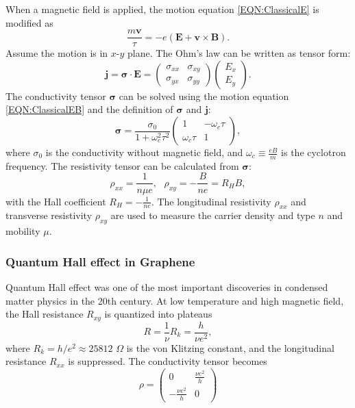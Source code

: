 \documentclass[pdflatex, sectionletters, 12pt]{pittetd}    %
\begin{document}
When a magnetic field is applied, the motion equation \ref{EQN:ClassicalE} is modified as 
\begin{equation}
\frac{m\mathbf{v}}{\tau} = -e(\mathbf{E} + \mathbf{v} \times \mathbf{B}).
\label{EQN:ClassicalEB}
\end{equation}
Assume the motion is in $x$-$y$ plane. The Ohm's law can be written as tensor form:
$$
\mathbf{j} = 
\mathbf{\sigma} \cdot \mathbf{E} =
\begin{pmatrix}
\sigma_{xx} & \sigma_{xy} \\
\sigma_{yx} & \sigma_{yy}
\end{pmatrix}
\begin{pmatrix}
E_{x} \\
E_{y}
\end{pmatrix}.
$$
The conductivity tensor $\mathbf{\sigma}$ can be solved using the motion equation \ref{EQN:ClassicalEB} and the definition of $\mathbf{\sigma}$ and $\mathbf{j}$:
$$
\mathbf{\sigma} = \frac{\sigma_0}{1 + \omega_c^2\tau^2}
\begin{pmatrix}
1 & -\omega_c\tau \\
\omega_c\tau & 1
\end{pmatrix},
$$
where $\sigma_0$ is the conductivity without magnetic field, and $\displaystyle \omega_c \equiv \frac{eB}{m}$ is the cyclotron frequency. The resistivity tensor can be calculated from $\mathbf{\sigma}$:
\begin{equation}
\rho_{xx} = \frac{1}{n\mu e}, \ \ \ \rho_{xy} = -\frac{B}{n e} = R_H B,
\label{EQN:Hall}
\end{equation}
with the Hall coefficient $\displaystyle R_H = -\frac{1}{ne}.$
The longitudinal resistivity $\rho_{xx}$ and transverse resistivity $\rho_{xy}$ are used to measure the carrier density and type $n$ and mobility $\mu$.

\subsubsection{Quantum Hall effect in Graphene}
\label{SEC:QuantumHall}

Quantum Hall effect was one of the most important discoveries in condensed matter physics in the 20th century. At low temperature and high magnetic field, the Hall resistance $R_{xy}$ is quantized into plateaus\cite{klitzing1980new} 
$$
R = \frac{1}{\nu}R_k = \frac{h}{\nu e^2},
$$
where $R_k = h/e^2 \approx 25812$ $\Omega$ is the von Klitzing constant, and the longitudinal resistance $R_{xx}$ is suppressed. The conductivity tensor becomes
$$ \displaystyle
\rho = 
\begin{pmatrix}
0 & \frac{\nu e^2}{h} \\ 
-\frac{\nu e^2}{h} & 0
\end{pmatrix}
$$
\end{document}
